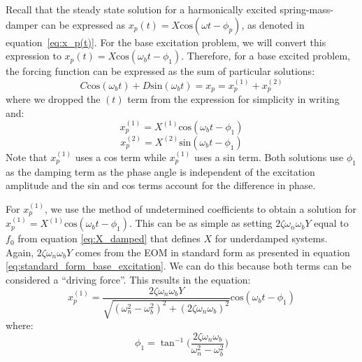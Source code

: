 \documentclass[12pt,letter]{article}
\numberwithin{ex}{section} %
\numberwithin{re}{section} %
\numberwithin{pr}{section} %
\begin{document}
				 Recall that the steady state solution for a harmonically excited spring-mass-damper can be expressed as $x_p(t) = X\text{cos}(\omega t - \phi_p)$, as denoted in equation~\ref{eq:x_p(t)}. For the base excitation problem, we will convert this expression to $x_p(t) = X\text{cos}(\omega_b t - \phi_1)$. Therefore, for a base excited problem, the forcing function can be expressed as the sum of particular solutions:
				\begin{equation}
					C \text{cos}(\omega_b t)  + D \text{sin}(\omega_b t)   = x_p = 	x_p^{(1)} + 	x_p^{(2)} 
				\end{equation}
				where we dropped the $(t)$ term from the expression for simplicity in writing and:
				\begin{equation}
					x_p^{(1)} = X^{(1)}\text{cos}(\omega_b t - \phi_1)
				\end{equation}
				\begin{equation}
					x_p^{(2)} = X^{(2)} \text{sin}(\omega_b t - \phi_1)
				\end{equation}
				Note that $x_p^{(1)}$ uses a cos term while $x_p^{(1)}$ uses a sin term. Both solutions use $\phi_1$ as the damping term as the phase angle is independent of the excitation amplitude and the sin and cos terms account for the difference in phase. 
				
				For $x_p^{(1)}$, we use the method of undetermined coefficients to obtain a solution for $x_p^{(1)} = X^{(1)}\text{cos}(\omega_b t - \phi_1)$. This can be as simple as setting $2 \zeta \omega_n \omega_b Y$ equal to $f_0$ from equation \ref{eq:X_damped} that defines $X$ for underdamped systems. Again, $2 \zeta \omega_n \omega_b Y$  comes from the EOM in standard form as presented in equation 	
				\ref{eq:standard_form_base_excitation}. We can do this because both terms can be considered a ``driving force''. This results in the equation:
				\begin{equation}
					x_p^{(1)} = \frac{2 \zeta \omega_n \omega_b Y}{\sqrt{(\omega_n^2 - \omega_b^2)^2 +  (2\zeta \omega_n \omega_b)^2}}  \text{cos}(\omega_b t - \phi_1)
					\label{eq:xp_1}
				\end{equation}
				where:
				\begin{equation}
					\phi_1 = \tan^{-1} \bigg(\frac{2\zeta \omega_n \omega_b}{\omega_n^2 - \omega_b^2}\bigg)
				\end{equation}
				
\end{document}
